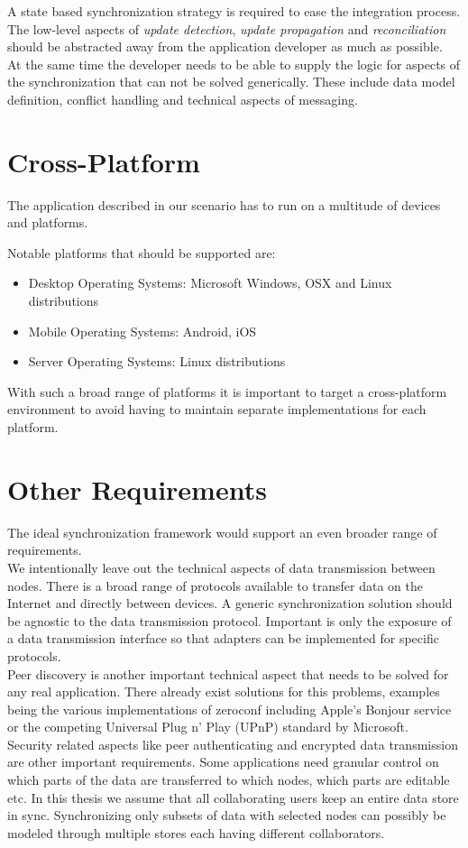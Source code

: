 A state based synchronization strategy is required to ease the integration process. The low-level aspects of \emph{update detection}, \emph{update propagation} and \emph{reconciliation} should be abstracted away from the application developer as much as possible.\\
At the same time the developer needs to be able to supply the logic for aspects of the synchronization that can not be solved generically. These include data model definition, conflict handling and technical aspects of messaging.

\section{Cross-Platform}
The application described in our scenario has to run on a multitude of devices and platforms.

Notable platforms that should be supported are:

\begin{itemize}
\item Desktop Operating Systems: Microsoft Windows, OSX and Linux distributions
\item Mobile Operating Systems: Android, iOS
\item Server Operating Systems: Linux distributions
\end{itemize}

With such a broad range of platforms it is important to target a cross-platform environment to avoid having to maintain separate implementations for each platform.

\section{Other Requirements}
The ideal synchronization framework would support an even broader range of requirements.\\
We intentionally leave out the technical aspects of data transmission between nodes.
There is a broad range of protocols available to transfer data on the Internet and directly between devices.
A generic synchronization solution should be agnostic to the data transmission protocol.
Important is only the exposure of a data transmission interface so that adapters can be implemented for specific protocols.\\
Peer discovery is another important technical aspect that needs to be solved for any real application.
There already exist solutions for this problems, examples being the various implementations of zeroconf \cite{gunes2002ip} including Apple's Bonjour service or the competing Universal Plug n' Play (UPnP) \cite{miller2001home} standard by Microsoft.\\
Security related aspects like peer authenticating and encrypted data transmission are other important requirements.
Some applications need granular control on which parts of the data are transferred to which nodes, which parts are editable etc.
In this thesis we assume that all collaborating users keep an entire data store in sync.
Synchronizing only subsets of data with selected nodes can possibly be modeled through multiple stores each having different collaborators.

